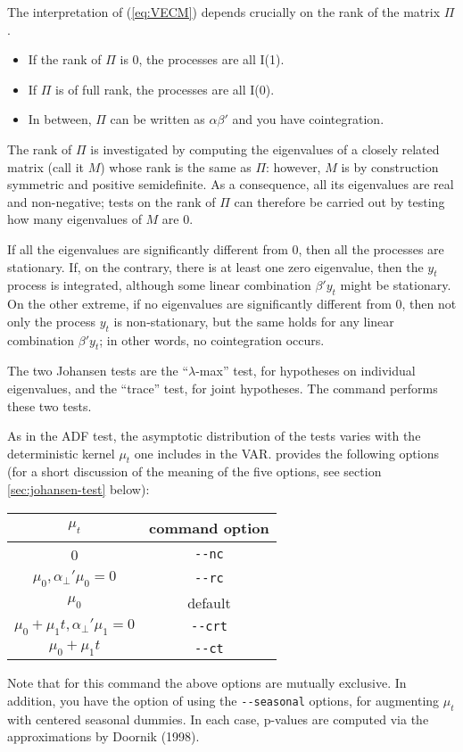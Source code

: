 The interpretation of (\ref{eq:VECM}) depends crucially on the rank of
the matrix $\Pi$.
\begin{itemize}
\item If the rank of $\Pi$ is 0, the processes are all I(1).
\item If $\Pi$ is of full rank, the processes are all I(0).
\item In between, $\Pi$ can be written as $\alpha \beta'$ and you have
  cointegration.
\end{itemize}

The rank of $\Pi$ is investigated by computing the eigenvalues of a
closely related matrix (call it $M$) whose rank is the same as $\Pi$:
however, $M$ is by construction symmetric and positive semidefinite.
As a consequence, all its eigenvalues are real and non-negative; tests
on the rank of $\Pi$ can therefore be carried out by testing how many
eigenvalues of $M$ are 0.

If all the eigenvalues are significantly different from 0, then all the
processes are stationary. If, on the contrary, there is at least one
zero eigenvalue, then the $y_t$ process is integrated, although some
linear combination $\beta'y_t$ might be stationary. On the other
extreme, if no eigenvalues are significantly different from 0, then not
only the process $y_t$ is non-stationary, but the same holds for any
linear combination $\beta'y_t$; in other words, no cointegration
occurs.

The two Johansen tests are the ``$\lambda$-max'' test, for hypotheses
on individual eigenvalues, and the ``trace'' test, for joint
hypotheses.  The  command  performs these two
tests.  

As in the ADF test, the asymptotic distribution of the tests varies
with the deterministic kernel $\mu_t$ one includes in the VAR.
 provides the following options (for a short discussion of
the meaning of the five options, see section \ref{sec:johansen-test} below):
\begin{center}
  \begin{tabular}{cc}
    \hline
    $\mu_t$ & command option \\
    \hline
    0 & \verb|--nc| \\
    $\mu_0, \alpha_{\perp}'\mu_0 = 0 $ &  \verb|--rc| \\
    $\mu_0$ &  default \\
    $\mu_0 + \mu_1 t , \alpha_{\perp}'\mu_1 = 0$ &  \verb|--crt| \\
    $\mu_0 + \mu_1 t$ &  \verb|--ct| \\
    \hline
  \end{tabular}
\end{center}
Note that for this command the above options are mutually exclusive.
In addition, you have the option of using the \verb|--seasonal|
options, for augmenting $\mu_t$ with centered seasonal dummies.  In
each case, p-values are computed via the approximations by Doornik
(1998).

